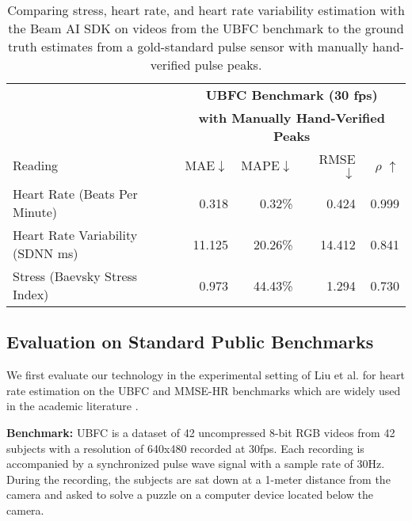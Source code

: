 \documentclass{article}
\begin{document}
\begin{table}[t]
    \centering
    \tabcolsep=0.5cm
    \begin{tabular}{lrrrr}
        {} & \multicolumn{4}{c}{\textbf{UBFC Benchmark (30 fps)}} \\
        {} & \multicolumn{4}{c}{\textbf{with Manually Hand-Verified Peaks}} \\
        Reading & MAE$\downarrow$ & MAPE$\downarrow$ & RMSE$\downarrow$ & $\rho$ $\uparrow$ \\
        \midrule
        Heart Rate {\small (Beats Per Minute)} & 0.318 & 0.32\% & 0.424 & 0.999  \\
        Heart Rate Variability {\small (SDNN ms)} & 11.125 & 20.26\% & 14.412 & 0.841  \\ 
        Stress {\small (Baevsky Stress Index)} & 0.973 & 44.43\% & 1.294 & 0.730 \\
    \end{tabular}
    \vspace{0.05in}
    \caption{Comparing stress, heart rate, and heart rate variability estimation with the Beam AI SDK on videos from the UBFC \cite{Bobbia17_UBFC} benchmark to the ground truth estimates from a gold-standard pulse sensor with manually hand-verified pulse peaks.}
    \vspace{-0.2in}
    \label{tab:ubfc-eval-with-manual-data}
\end{table}

\subsection{Evaluation on Standard Public Benchmarks}
\label{sec:prior-lit}

We first evaluate our technology in the experimental setting of Liu et al. \cite{TSCAN_Liu2020} for heart rate estimation on the UBFC \cite{Bobbia17_UBFC} and MMSE-HR \cite{Zhang16_MMSE} benchmarks which are widely used in the academic literature \cite{TSCAN_Liu2020, EfficientPhys_Liu2021, MetaPhys_Liu2021}.


\label{sec:ubfc}
\textbf{Benchmark:} UBFC \cite{Bobbia17_UBFC} is a dataset of 42 uncompressed 8-bit RGB videos from 42 subjects with a resolution of 640x480 recorded at 30fps. Each recording is accompanied by a synchronized pulse  wave signal with a sample rate of 30Hz. During the recording, the subjects are sat down at a 1-meter distance from the camera and asked to solve a puzzle on a computer device located below the camera. 
\end{document}
